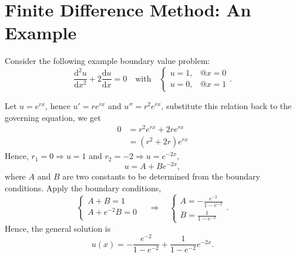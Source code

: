 \documentclass[a4paper]{article}
\begin{document}
\section{Finite Difference Method: An Example}
Consider the following example boundary value problem:
\[
    \frac{\mathrm{d}^2 u}{\mathrm{d}x^2} + 2 \frac{\mathrm{d}u}{\mathrm{d}x} = 0
    \quad \text{with} \quad
    \begin{cases}
        u = 1, & @ x = 0 \\
        u = 0, & @ x = 1
    \end{cases}.
\]
\begin{tcolorbox}[title = Analytical Solution Procedure]
    Let $u = e^{rx}$, hence $u' = r e^{rx}$ and $u'' = r^2 e^{rx}$, substitute this relation back to the governing equation, we get
    \begin{align*}
        0 & = r^2 e^{rx} + 2r e^{rx} \\
        & = (r^2 + 2r) e^{rx}
    \end{align*}
    Hence, $r_1 = 0 \Rightarrow u = 1$ and $r_2 = -2 \Rightarrow u = e^{-2x}$,
    \[
        u = A + B e^{-2x},
    \]
    where $A$ and $B$ are two constants to be determined from the boundary conditions. Apply the boundary conditions,
    \[
        \begin{cases}
            A + B = 1 \\
            A + e^{-2}B = 0 \\
        \end{cases}
        \quad \Rightarrow \quad 
        \begin{cases}
            A = -\frac{e^{-2}}{1 - e^{-2}} \\[.3cm]
            B = \frac{1}{1 - e^{-2}}
        \end{cases}.
    \]
    Hence, the general solution is
    \[
        u(x) = -\frac{e^{-2}}{1 - e^{-2}} + \frac{1}{1 - e^{-2}} e^{-2x}.
    \]
\end{tcolorbox}
\end{document}
